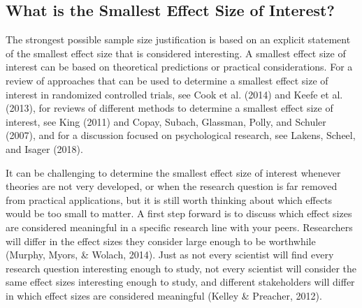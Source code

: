 \documentclass[
  english,
  ,jou,floatsintext]{apa6}
\begin{document}
\hypertarget{what-is-the-smallest-effect-size-of-interest}{%
\subsection{What is the Smallest Effect Size of Interest?}\label{what-is-the-smallest-effect-size-of-interest}}

The strongest possible sample size justification is based on an explicit statement of the smallest effect size that is considered interesting. A smallest effect size of interest can be based on theoretical predictions or practical considerations. For a review of approaches that can be used to determine a smallest effect size of interest in randomized controlled trials, see Cook et al. (2014) and Keefe et al. (2013), for reviews of different methods to determine a smallest effect size of interest, see King (2011) and Copay, Subach, Glassman, Polly, and Schuler (2007), and for a discussion focused on psychological research, see Lakens, Scheel, and Isager (2018).

It can be challenging to determine the smallest effect size of interest whenever theories are not very developed, or when the research question is far removed from practical applications, but it is still worth thinking about which effects would be too small to matter. A first step forward is to discuss which effect sizes are considered meaningful in a specific research line with your peers. Researchers will differ in the effect sizes they consider large enough to be worthwhile (Murphy, Myors, \& Wolach, 2014). Just as not every scientist will find every research question interesting enough to study, not every scientist will consider the same effect sizes interesting enough to study, and different stakeholders will differ in which effect sizes are considered meaningful (Kelley \& Preacher, 2012).
\end{document}
